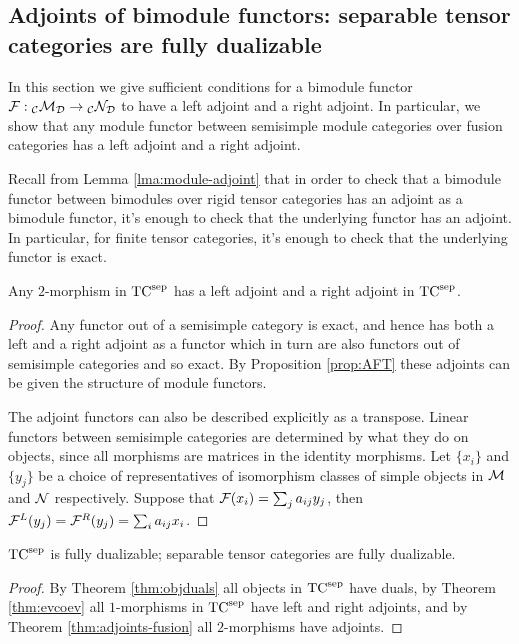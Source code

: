 \documentclass{amsart}
\begin{document}
\subsection{Adjoints of bimodule functors: separable tensor categories are fully dualizable} \label{sec:df-functors}

In this section we give sufficient conditions for a bimodule functor $\mathcal F: {}_\mathcal C \mathcal M_\mathcal D \rightarrow {}_\mathcal C \mathcal N_\mathcal D$ to have a left adjoint and a right adjoint.  In particular, we show that any module functor between semisimple module categories over fusion categories has a left adjoint and a right adjoint. 

Recall from Lemma \ref{lma:module-adjoint} that in order to check that a bimodule functor between bimodules over rigid tensor categories has an adjoint as a bimodule functor, it's enough to check that the underlying functor has an adjoint.  In particular, for finite tensor categories, it's enough to check that the underlying functor is exact.

\begin{theorem} \label{thm:adjoints-fusion}
Any $2$-morphism in ${\mathrm{TC}^{\text{sep}}}$ has a left adjoint and a right adjoint in ${\mathrm{TC}^{\text{sep}}}$.
\end{theorem}
\begin{proof}
Any functor out of a semisimple category is exact, and hence has both a left and a right adjoint as a functor which in turn are also functors out of semisimple categories and so exact.  By Proposition \ref{prop:AFT} these adjoints can be given the structure of module functors.

The adjoint functors can also be described explicitly as a transpose.  Linear functors between semisimple categories are determined by what they do on objects, since all morphisms are matrices in the identity morphisms.  Let $\{x_i\}$ and $\{y_j\}$ be a choice of representatives of isomorphism classes of simple objects in $\mathcal M$ and $\mathcal N$ respectively.  Suppose that $\mathcal F(x_i) = \sum_j a_{ij} y_j$, then $\mathcal F^L(y_j) = \mathcal F^R(y_j) = \sum_i a_{ij} x_i$. 
\end{proof}

\begin{maintheorem}  \label{thm:TC-dualizable}
 ${\mathrm{TC}^{\text{sep}}}$ is fully dualizable; separable tensor categories are fully dualizable.
\end{maintheorem}
\begin{proof}
By Theorem \ref{thm:objduals} all objects in ${\mathrm{TC}^{\text{sep}}}$ have duals, by Theorem \ref{thm:evcoev} all $1$-morphisms in ${\mathrm{TC}^{\text{sep}}}$ have left and right adjoints, and by Theorem \ref{thm:adjoints-fusion} all $2$-morphisms have adjoints.
\end{proof}
\end{document}
